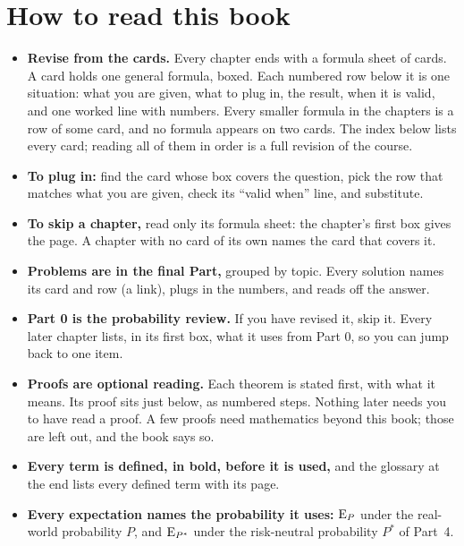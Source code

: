 \section*{How to read this book}
\begin{itemize}
  \item \textbf{Revise from the cards.} Every chapter ends with a formula sheet of cards. A card holds one general formula, boxed. Each numbered row below it is one situation: what you are given, what to plug in, the result, when it is valid, and one worked line with numbers. Every smaller formula in the chapters is a row of some card, and no formula appears on two cards. The index below lists every card; reading all of them in order is a full revision of the course.
  \item \textbf{To plug in:} find the card whose box covers the question, pick the row that matches what you are given, check its ``valid when'' line, and substitute.
  \item \textbf{To skip a chapter,} read only its formula sheet: the chapter's first box gives the page. A chapter with no card of its own names the card that covers it.
  \item \textbf{Problems are in the final Part,} grouped by topic. Every solution names its card and row (a link), plugs in the numbers, and reads off the answer.
  \item \textbf{Part 0 is the probability review.} If you have revised it, skip it. Every later chapter lists, in its first box, what it uses from Part 0, so you can jump back to one item.
  \item \textbf{Proofs are optional reading.} Each theorem is stated first, with what it means. Its proof sits just below, as numbered steps. Nothing later needs you to have read a proof. A few proofs need mathematics beyond this book; those are left out, and the book says so.
  \item \textbf{Every term is defined, in bold, before it is used,} and the glossary at the end lists every defined term with its page.
  \item \textbf{Every expectation names the probability it uses:} $\operatorname{E}_P$ under the real-world probability $P$, and $\operatorname{E}_{P^*}$ under the risk-neutral probability $P^*$ of Part~4.
\end{itemize}

